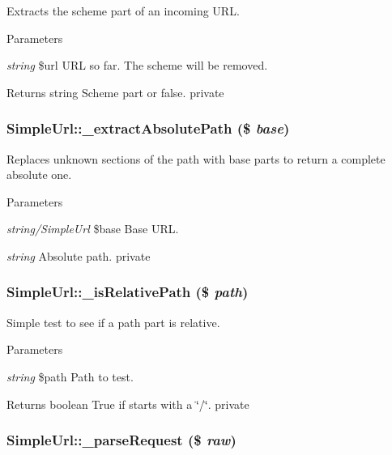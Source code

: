 \label{class_simple_url_abc9b0e3099de7c313a91c75dca8ddd30}
Extracts the scheme part of an incoming URL. 
\begin{DoxyParams}{Parameters}
\item[{\em string}]\$url URL so far. The scheme will be removed. \end{DoxyParams}
\begin{DoxyReturn}{Returns}
string Scheme part or false.  private 
\end{DoxyReturn}
\hypertarget{class_simple_url_a56da2f1399b0231dec5224f8c431b1f6}{
\subsubsection[{\_\-extractAbsolutePath}]{\setlength{\rightskip}{0pt plus 5cm}SimpleUrl::\_\-extractAbsolutePath (\$ {\em base})}}
\label{class_simple_url_a56da2f1399b0231dec5224f8c431b1f6}
Replaces unknown sections of the path with base parts to return a complete absolute one. 
\begin{DoxyParams}{Parameters}
\item[{\em string/SimpleUrl}]\$base Base URL. \item[{\em string}]Absolute path.  private \end{DoxyParams}
\hypertarget{class_simple_url_a950016c5387e828c0f11e1cfe38467b5}{
\subsubsection[{\_\-isRelativePath}]{\setlength{\rightskip}{0pt plus 5cm}SimpleUrl::\_\-isRelativePath (\$ {\em path})}}
\label{class_simple_url_a950016c5387e828c0f11e1cfe38467b5}
Simple test to see if a path part is relative. 
\begin{DoxyParams}{Parameters}
\item[{\em string}]\$path Path to test. \end{DoxyParams}
\begin{DoxyReturn}{Returns}
boolean True if starts with a \char`\"{}/\char`\"{}.  private 
\end{DoxyReturn}
\hypertarget{class_simple_url_adb792cc59598aacaaadb5adc428efda8}{
\subsubsection[{\_\-parseRequest}]{\setlength{\rightskip}{0pt plus 5cm}SimpleUrl::\_\-parseRequest (\$ {\em raw})}}
